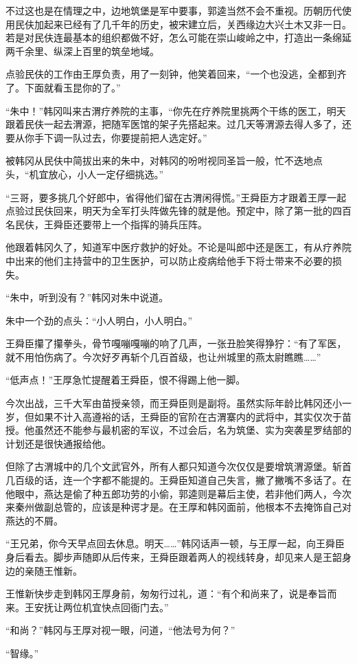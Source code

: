 不过这也是在情理之中，边地筑堡是军中要事，郭逵当然不会不重视。历朝历代使用民伕加起来已经有了几千年的历史，被宋建立后，关西缘边大兴土木又非一日。若是对民伕连最基本的组织都做不好，怎么可能在崇山峻岭之中，打造出一条绵延两千余里、纵深上百里的筑垒地域。

点验民伕的工作由王厚负责，用了一刻钟，他笑着回来，“一个也没逃，全都到齐了。下面就看玉昆你的了。”

“朱中！”韩冈叫来古渭疗养院的主事，“你先在疗养院里挑两个干练的医工，明天跟着民伕一起去渭源，把随军医馆的架子先搭起来。过几天等渭源去得人多了，还要从你手下调一队过去，你要提前把人选定好。”

被韩冈从民伕中简拔出来的朱中，对韩冈的吩咐视同圣旨一般，忙不迭地点头，“机宜放心，小人一定仔细挑选。”

“三哥，要多挑几个好郎中，省得他们留在古渭闲得慌。”王舜臣方才跟着王厚一起点验过民伕回来，明天为全军打头阵做先锋的就是他。预定中，除了第一批的四百名民伕，王舜臣还要带上一个指挥的骑兵压阵。

他跟着韩冈久了，知道军中医疗救护的好处。不论是叫郎中还是医工，有从疗养院中出来的他们主持营中的卫生医护，可以防止疫病给他手下将士带来不必要的损失。

“朱中，听到没有？”韩冈对朱中说道。

朱中一个劲的点头：“小人明白，小人明白。”

王舜臣攥了攥拳头，骨节嘎嘣嘎嘣的响了几声，一张丑脸笑得狰狞：“有了军医，就不用怕伤病了。今次好歹再斩个几百首级，也让州城里的燕太尉瞧瞧……”

“低声点！”王厚急忙提醒着王舜臣，恨不得踢上他一脚。

今次出战，三千大军由苗授亲领，而王舜臣则是副将。虽然实际年龄比韩冈还小一岁，但如果不计入高遵裕的话，王舜臣的官阶在古渭寨内的武将中，其实仅次于苗授。他虽然还不能参与最机密的军议，不过会后，名为筑堡、实为突袭星罗结部的计划还是很快通报给他。

但除了古渭城中的几个文武官外，所有人都只知道今次仅仅是要增筑渭源堡。斩首几百级的话，连一个字都不能提的。王舜臣知道自己失言，撇了撇嘴不多话了。在他眼中，燕达是偷了种五郎功劳的小偷，郭逵则是幕后主使，若非他们两人，今次来秦州做副总管的，应该是种谔才是。在王厚和韩冈面前，他根本不去掩饰自己对燕达的不屑。

“王兄弟，你今天早点回去休息。明天……”韩冈话声一顿，与王厚一起，向王舜臣身后看去。脚步声随即从后传来，王舜臣跟着两人的视线转身，却见来人是王韶身边的亲随王惟新。

王惟新快步走到韩冈王厚身前，匆匆行过礼，道：“有个和尚来了，说是奉旨而来。王安抚让两位机宜快点回衙门去。”

“和尚？”韩冈与王厚对视一眼，问道，“他法号为何？”

“智缘。”

